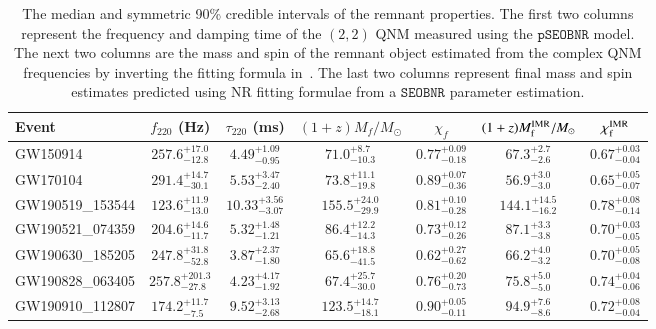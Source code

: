 \documentclass[twocolumn,prd,aps,superscriptaddress,preprintnumbers,tightenlines,showpacs,nofootinbib,eqsecnum,amsfonts,amsmath]{revtex4-1}
\newcommand{\Mo}{M_{\odot}}
\newcommand{\fngr}[1]{f_{\text{#1}}}
\newcommand{\taungr}[1]{\tau_{\text{#1}}}
\newcommand{\pSEOB}{\texttt{pSEOBNR}}
\newcommand{\SEOB}{\texttt{SEOBNR}}
\begin{document}
\begin{table}

\begin{tabular}{l|c|c|c|c|c|c}
\toprule
Event & $\fngr{220}$ (Hz) & $\taungr{220}$ (ms) & $(1+z)M_f/\Mo$ & $\chi_f$ & $(1+z)M_{\text{f}}^{\rm IMR}/\Mo$ & $\chi_{\text{f}}^{\rm IMR}$ \\[0.075cm]
\midrule
\hline

GW150914 &
$257.6^{+17.0}_{-12.8}$ &
$4.49^{+1.09}_{-0.95}$ &
$71.0^{+8.7}_{-10.3}$ &
$0.77^{+0.09}_{-0.18}$ &
$67.3^{+2.7}_{-2.6}$ &
$0.67^{+0.03}_{-0.04}$
\\[0.075cm]

GW170104 &
$291.4^{+14.7}_{-30.1}$ &
$5.53^{+3.47}_{-2.40}$ &
$73.8^{+11.1}_{-19.8}$ &
$0.89^{+0.07}_{-0.36}$ &
$56.9^{+3.0}_{-3.0}$ &
$0.65^{+0.05}_{-0.07}$
\\[0.075cm]

GW190519\_153544 &
$123.6^{+11.9}_{-13.0}$ &
$10.33^{+3.56}_{-3.07}$ &
$155.5^{+24.0}_{-29.9}$ &
$0.81^{+0.10}_{-0.28}$ &
$144.1^{+14.5}_{-16.2}$ &
$0.78^{+0.08}_{-0.14}$
\\[0.075cm]

GW190521\_074359 &
$204.6^{+14.6}_{-11.7}$ &
$5.32^{+1.48}_{-1.21}$ &
$86.4^{+12.2}_{-14.3}$ &
$0.73^{+0.12}_{-0.26}$ &
$87.1^{+3.3}_{-3.8}$ &
$0.70^{+0.03}_{-0.05}$
\\[0.075cm]

GW190630\_185205 &
$247.8^{+31.8}_{-52.8}$ &
$3.87^{+2.37}_{-1.80}$ &
$65.6^{+18.8}_{-41.5}$ &
$0.62^{+0.27}_{-0.62}$ &
$66.2^{+4.0}_{-3.2}$ &
$0.70^{+0.05}_{-0.08}$
\\[0.075cm]

GW190828\_063405 &
$257.8^{+201.3}_{-27.8}$ &
$4.23^{+4.17}_{-1.92}$ &
$67.4^{+25.7}_{-30.0}$ &
$0.76^{+0.20}_{-0.73}$ &
$75.8^{+5.0}_{-5.0}$ &
$0.74^{+0.04}_{-0.06}$
\\[0.075cm]

GW190910\_112807 &
$174.2^{+11.7}_{-7.5}$ &
$9.52^{+3.13}_{-2.68}$ &
$123.5^{+14.7}_{-18.1}$ &
$0.90^{+0.05}_{-0.11}$ &
$94.9^{+7.6}_{-8.6}$ &
$0.72^{+0.08}_{-0.04}$
\\[0.075cm]

\bottomrule
\end{tabular}
\caption{The median and symmetric 90\% credible intervals of the remnant properties. The first two columns represent the frequency and damping time of the $(2,2)$ QNM measured using the $\pSEOB$ model. The next two columns are the mass and spin of the remnant object estimated from the complex QNM frequencies by inverting the fitting formula in~\cite{Berti:2005ys}. The last two columns represent final mass and spin estimates predicted using NR fitting formulae from a $\SEOB$ parameter estimation.}
\label{tab:qnm_o1o2_results}
\end{table}
\end{document}
